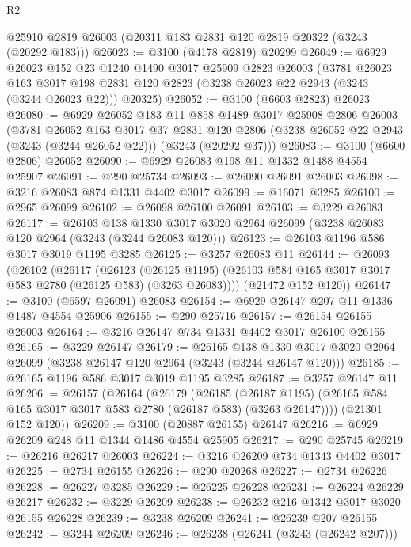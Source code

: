 \begin{lexlean}{R2}
\begin{coremodule}
    @25910
    @2819
    @26003
    (@20311 @183 @2831 @120 @2819 @20322 (@3243 (@20292 @183)))
@26023 := @3100 (@4178 @2819) @20299
@26049 := @6929
    @26023
    @152
    @23
    @1240
    @1490
    @3017
    @25909
    @2823
    @26003
    (@3781
      @26023
      @163
      @3017
      @198
      @2831
      @120
      @2823
      (@3238 @26023 @22 @2943 (@3243 (@3244 @26023 @22)))
      @20325)
@26052 := @3100 (@6603 @2823) @26023
@26080 := @6929
    @26052
    @183
    @11
    @858
    @1489
    @3017
    @25908
    @2806
    @26003
    (@3781
      @26052
      @163
      @3017
      @37
      @2831
      @120
      @2806
      (@3238 @26052 @22 @2943 (@3243 (@3244 @26052 @22)))
      (@3243 (@20292 @37)))
@26083 := @3100 (@6600 @2806) @26052
@26090 := @6929 @26083 @198 @11 @1332 @1488 @4554 @25907
@26091 := @290 @25734
@26093 := @26090 @26091 @26003
@26098 := @3216 @26083 @874 @1331 @4402 @3017
@26099 := @16071 @3285
@26100 := @2965 @26099
@26102 := @26098 @26100 @26091
@26103 := @3229 @26083
@26117 := @26103
    @138
    @1330
    @3017
    @3020
    @2964
    @26099
    (@3238 @26083 @120 @2964 (@3243 (@3244 @26083 @120)))
@26123 := @26103 @1196 @586 @3017 @3019 @1195 @3285
@26125 := @3257 @26083 @11
@26144 := @26093
    (@26102
      (@26117
        (@26123
          (@26125 @1195)
          (@26103 @584 @165 @3017 @3017 @583 @2780 (@26125 @583) (@3263 @26083))))
      (@21472 @152 @120))
@26147 := @3100 (@6597 @26091) @26083
@26154 := @6929 @26147 @207 @11 @1336 @1487 @4554 @25906
@26155 := @290 @25716
@26157 := @26154 @26155 @26003
@26164 := @3216 @26147 @734 @1331 @4402 @3017 @26100 @26155
@26165 := @3229 @26147
@26179 := @26165
    @138
    @1330
    @3017
    @3020
    @2964
    @26099
    (@3238 @26147 @120 @2964 (@3243 (@3244 @26147 @120)))
@26185 := @26165 @1196 @586 @3017 @3019 @1195 @3285
@26187 := @3257 @26147 @11
@26206 := @26157
    (@26164
      (@26179
        (@26185
          (@26187 @1195)
          (@26165 @584 @165 @3017 @3017 @583 @2780 (@26187 @583) (@3263 @26147))))
      (@21301 @152 @120))
@26209 := @3100 (@20887 @26155) @26147
@26216 := @6929 @26209 @248 @11 @1344 @1486 @4554 @25905
@26217 := @290 @25745
@26219 := @26216 @26217 @26003
@26224 := @3216 @26209 @734 @1343 @4402 @3017
@26225 := @2734 @26155
@26226 := @290 @20268
@26227 := @2734 @26226
@26228 := @26227 @3285
@26229 := @26225 @26228
@26231 := @26224 @26229 @26217
@26232 := @3229 @26209
@26238 := @26232 @216 @1342 @3017 @3020 @26155 @26228
@26239 := @3238 @26209
@26241 := @26239 @207 @26155
@26242 := @3244 @26209
@26246 := @26238 (@26241 (@3243 (@26242 @207)))

\end{coremodule}
\end{lexlean}
